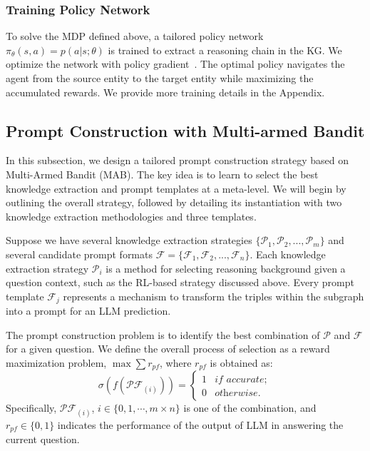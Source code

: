 \documentclass{article}
\theoremstyle{boldremark}
\begin{document}
\subsubsection{Training Policy Network}
To solve the MDP defined above, a tailored policy network $\pi_{\theta}(s,a) = p(a|s;\theta) $ is trained to extract a reasoning chain in the KG. We optimize the network with policy gradient~\cite{xiong2017deeppath}.
The optimal policy navigates the agent from the source entity to the target entity while maximizing the accumulated rewards. We provide more training details in the Appendix.



\subsection{Prompt Construction with Multi-armed Bandit}
In this subsection, we design a tailored prompt construction strategy based on Multi-Armed Bandit (MAB). The key idea is to learn to select the best knowledge extraction and prompt templates at a meta-level. We will begin by outlining the overall strategy, followed by detailing its instantiation with two knowledge extraction methodologies and three templates.

Suppose we have several knowledge extraction strategies $\{\mathcal{P}_1, \mathcal{P}_2, ..., \mathcal{P}_m\}$ and several candidate prompt formats $\mathcal{F} = \{\mathcal{F}_1, \mathcal{F}_2, ..., \mathcal{F}_n\}$. Each knowledge extraction strategy $\mathcal{P}_i$ is a method for selecting reasoning background given a question context, such as the RL-based strategy discussed above. Every prompt template $\mathcal{F}_j$ represents a mechanism to transform the triples within the subgraph into a prompt for an LLM prediction.


The prompt construction problem is to identify the best combination of $\mathcal{P}$ and $\mathcal{F}$ for a given question. We define the overall process of selection as a reward maximization problem, $\max \sum r_{pf}$, where $r_{pf}$ is obtained as:
\begin{equation}
\sigma( f(\mathcal{P}\mathcal{F}_{(i)})) =
\begin{cases}
    1 & \textit{if } accurate; \\
    0 & \textit{otherwise}.
\end{cases}
\end{equation} 
Specifically, $\mathcal{P}\mathcal{F}_{(i)}$, $i\in\{0,1,\cdots, m \times n\}$ is one of the combination, and $r_{pf}\in \{0,1\}$ indicates the performance of the output of LLM in answering the current question. 
\end{document}

